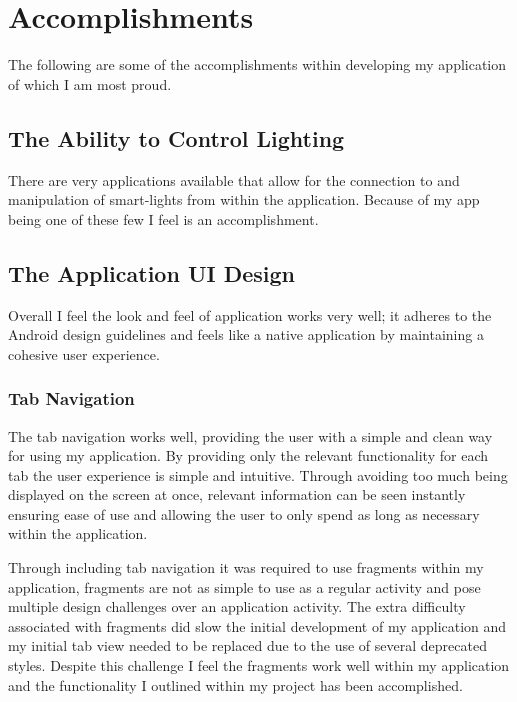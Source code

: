 \section{Accomplishments}\label{accomplishments}

The following are some of the accomplishments within developing my
application of which I am most proud.

\subsection{The Ability to Control
Lighting}\label{the-ability-to-control-lighting}

There are very applications available that allow for the connection to
and manipulation of smart-lights from within the application. Because of
my app being one of these few I feel is an accomplishment.

\subsection{The Application UI Design}\label{the-application-ui-design}

Overall I feel the look and feel of application works very well; it
adheres to the Android design guidelines \parencite{androiddesign} and
feels like a native application by maintaining a cohesive user
experience.

\subsubsection{Tab Navigation}\label{tab-navigation}

The tab navigation works well, providing the user with a simple and
clean way for using my application. By providing only the relevant
functionality for each tab the user experience is simple and intuitive.
Through avoiding too much being displayed on the screen at once,
relevant information can be seen instantly ensuring ease of use and
allowing the user to only spend as long as necessary within the
application.

Through including tab navigation it was required to use fragments within
my application, fragments are not as simple to use as a regular activity
and pose multiple design challenges over an application activity. The
extra difficulty associated with fragments did slow the initial
development of my application and my initial tab view needed to be
replaced due to the use of several deprecated styles. Despite this
challenge I feel the fragments work well within my application and the
functionality I outlined within my project has been accomplished.

